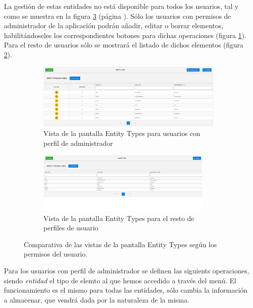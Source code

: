 La gestión de estas entidades no está disponible para todos los usuarios, tal y como se muestra en la figura \ref{fig:parametrizacion} (página \pageref{fig:parametrizacion}). Sólo los usuarios con permisos de administrador de la aplicación podrán añadir, editar o borrar elementos, habilitándoseles los correspondientes botones para dichas operaciones (figura  \ref{fig:parametrizacion-admin}). Para el resto de usuarios sólo se mostrará el listado de dichos elementos (figura \ref{fig:parametrizacion-usuario}).


\begin{figure}[H]
  \centering
  \begin{subfigure}[c]{0.4\textwidth}
    \includegraphics[width=\textwidth]{imaxes/entity-type-admin.png}
    \caption{Vista de la pantalla Entity Types para usuarios con perfil de administrador}
    \label{fig:parametrizacion-admin}
  \end{subfigure}
  \hspace{0.1\textwidth}
  \begin{subfigure}[c]{0.4\textwidth}
    \includegraphics[width=\textwidth,height=3cm]{imaxes/entity-type-usuario.png}
    \caption{Vista de la pantalla Entity Types para el resto de perfiles de usuario}
    \label{fig:parametrizacion-usuario}
  \end{subfigure}
  \caption{Comparativa de las vistas de la pantalla Entity Types según los permisos del usuario.}
  \label{fig:parametrizacion}
\end{figure}

Para los usuarios con perfil de administrador se definen las siguients operaciones, siendo \textit{entidad} el tipo de elemto al que hemos accedido a través del menú. El funcionamiento es el mismo para todas las entidades, sólo cambia la información a almacenar, que vendrá dada por la naturaleza de la misma.


